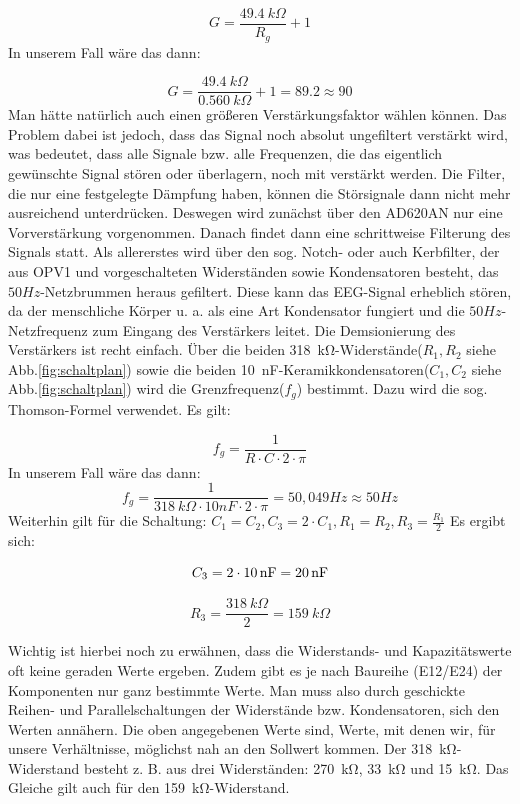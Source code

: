 \documentclass[10pt]{article}
\begin{document}
\[
 G=\frac{\SI{49.4}{kΩ}}{R_g}+1
\]
In unserem Fall wäre das dann:

\[
 G=\frac{\SI{49.4}{kΩ}}{\SI{0.560}{kΩ}}+1 = 89.2 \approx 90 
\]
Man hätte natürlich auch einen größeren Verstärkungsfaktor wählen können. Das Problem dabei ist jedoch, dass das Signal noch absolut ungefiltert verstärkt wird, was bedeutet, dass alle Signale bzw. alle Frequenzen, die das eigentlich gewünschte Signal stören oder überlagern, noch mit verstärkt werden. Die Filter, die nur eine festgelegte Dämpfung haben, können die Störsignale dann nicht mehr ausreichend unterdrücken. Deswegen wird zunächst über den AD620AN nur eine Vorverstärkung vorgenommen. Danach findet dann eine schrittweise Filterung des Signals statt. Als allererstes wird über den sog. Notch- oder  auch Kerbfilter, der aus OPV1 und vorgeschalteten Widerständen sowie Kondensatoren besteht, das $50Hz$-Netzbrummen heraus gefiltert. Diese kann das EEG-Signal erheblich stören, da der menschliche Körper u. a. als eine Art Kondensator fungiert und die $50Hz$-Netzfrequenz zum Eingang des Verstärkers leitet. Die Demsionierung des Verstärkers ist recht einfach. Über die beiden \SI{318}{kΩ}-Widerstände($R_1,R_2$ siehe Abb.\ref{fig:schaltplan}) sowie die beiden \SI{10}{\nano\farad}-Keramikkondensatoren($C_1,C_2$ siehe Abb.\ref{fig:schaltplan}) wird die Grenzfrequenz($f_g$) bestimmt. Dazu wird die sog. Thomson-Formel verwendet. Es gilt:

\[
 f_g=\frac{1}{R \cdot C \cdot 2 \cdot \pi}
\]
In unserem Fall wäre das dann:
\[
 f_g=\frac{1}{\SI{318}{kΩ} \cdot 10nF \cdot 2 \cdot \pi}=50,049Hz \approx 50Hz
\]
Weiterhin gilt für die Schaltung: $C_1 = C_2, C_3= 2\cdot C_1,R_1=R_2,R_3=\frac{R_1}{2} $ Es ergibt sich:

\[
    C_3 = 2 \cdot \SI{10}{\nano\farad} = \SI{20}{\nano\farad} \\
\]


\[
    R_3 = \frac{\SI{318}{kΩ}}{2}= \SI{159}{kΩ} 
\]

Wichtig ist hierbei noch zu erwähnen, dass die Widerstands- und Kapazitätswerte oft keine geraden Werte ergeben. Zudem gibt es je nach Baureihe (E12/E24) der Komponenten nur ganz bestimmte Werte. Man muss also durch geschickte Reihen- und Parallelschaltungen der Widerstände bzw. Kondensatoren, sich den Werten annähern. Die oben angegebenen Werte sind, Werte, mit denen wir, für unsere Verhältnisse, möglichst nah an den Sollwert kommen. Der \SI{318}{kΩ}-Widerstand besteht z. B. aus drei Widerständen:  \SI{270}{kΩ}, \SI{33}{kΩ} und \SI{15}{kΩ}. Das Gleiche gilt auch für den \SI{159}{kΩ}-Widerstand. 
\end{document}

